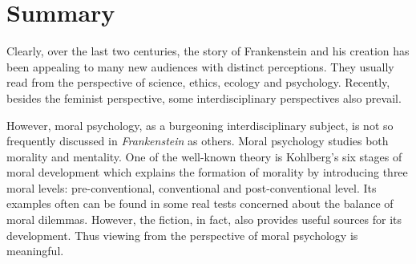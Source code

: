 \section{Summary} %
\label{sec:summary_literature}
\begin{text}

Clearly, over the last two centuries, the story of Frankenstein and his creation has been appealing to many new audiences with distinct perceptions. They usually read from the perspective of science, ethics, ecology and psychology. Recently, besides the feminist perspective, some interdisciplinary perspectives also prevail.

However, moral psychology, as a burgeoning interdisciplinary subject, is not so frequently discussed in \textit{Frankenstein} as others. Moral psychology studies both morality and mentality. One of the well-known theory is Kohlberg's six stages of moral development which explains the formation of morality by introducing three moral levels: pre-conventional, conventional and post-conventional level. Its examples often can be found in some real tests concerned about the balance of moral dilemmas. However, the fiction, in fact, also provides useful sources for its development. Thus viewing from the perspective of moral psychology is meaningful.

\end{text}


